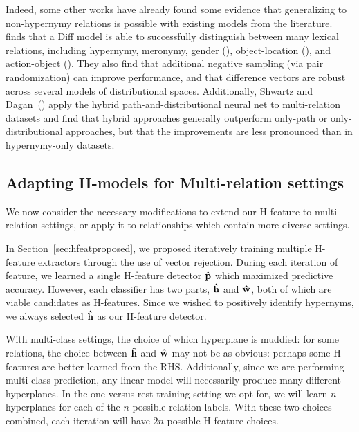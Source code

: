 Indeed, some other works have already found some evidence that generalizing to
non-hypernymy relations is possible with existing models from the literature.
 finds that a Diff model \cite{weeds:2004:coling}
is able to successfully distinguish between many lexical relations,
including hypernymy, meronymy, gender (), object-location
(), and action-object (). They also find that
additional negative sampling (via pair randomization) can improve performance,
and that difference vectors are robust across several models of distributional
spaces.  Additionally, Shwartz and
Dagan~() apply the
hybrid path-and-distributional neural net \cite{shwartz:2016:acl} to
multi-relation datasets and find that hybrid approaches generally outperform
only-path or only-distributional approaches, but that the improvements are less
pronounced than in hypernymy-only datasets.

\subsection{Adapting H-models for Multi-relation settings}

We now consider the necessary modifications to extend our H-feature to
multi-relation settings, or apply it to relationships which contain more
diverse settings.

In Section~\ref{sec:hfeatproposed}, we proposed iteratively training multiple
H-feature extractors through the use of vector rejection. During each iteration
of feature, we learned a single H-feature detector ${\mathbf{\hat p}}$ which maximized
predictive accuracy. However, each classifier has two parts, ${\mathbf{\hat h}}$ and
${\mathbf{\hat w}}$, both of which are viable candidates as H-features. Since we wished to
positively identify hypernyms, we always selected ${\mathbf{\hat h}}$ as our
H-feature detector.

With multi-class settings, the choice of which hyperplane is muddied: for
some relations, the choice between ${\mathbf{\hat h}}$ and ${\mathbf{\hat w}}$ may not be as obvious:
perhaps some H-features are better learned from the RHS. Additionally,
since we are performing multi-class prediction, any linear model will
necessarily produce many different hyperplanes. In the one-versus-rest
training setting we opt for, we will learn $n$ hyperplanes for each of the
$n$ possible relation labels. With these two choices combined, each iteration
will have $2n$ possible H-feature choices.

